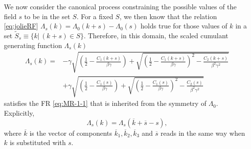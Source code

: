 \documentclass[a4paper,11pt]{article}
\numberwithin{equation}{section}
\begin{document}
We now consider the canonical process constraining the possible values of the field $s$ to be in the set $S$. For a fixed $S$, we then know that the relation \eqref{eq:jolieRF}  $\Lambda_s(k) = \Lambda_0 (k+s) - \Lambda_0 (s)$ holds true for those values of $k$ in a set $\widetilde{S}_s \equiv \{ k | \, (k+s) \in S \}$. Therefore, in this domain, the scaled cumulant generating function $\Lambda_s(k)$
\begin{align}
    \Lambda_s(k)=& - \gamma\sqrt{  \left( \frac{1}{2} - \frac{C_1(k+s)}{\beta\gamma}    \right) + \sqrt{\left( \frac{1}{2} - \frac{C_1(k+s)}{\beta\gamma}    \right)^2 - \frac{C_2(k+s)}{\beta^2\gamma^2}}} \nonumber \\
    &+ \gamma\sqrt{  \left( \frac{1}{2} - \frac{C_1(s)}{\beta\gamma}    \right) + \sqrt{\left( \frac{1}{2} - \frac{C_1(s)}{\beta\gamma}    \right)^2 - \frac{C_2(s)}{\beta^2\gamma^2}}}   
\end{align}
satisfies the FR \eqref{eq:MR-1-1} that is inherited from the symmetry of $\Lambda_0$. Explicitly,
\begin{equation}
    \Lambda_s(k) = \Lambda_s(\overline{k}+\overline{s}-s),
\end{equation}
where $\overline{k}$ is the vector of components $\overline{k}_1,\overline{k}_2,\overline{k}_3$ and $\overline{s}$ reads in the same way when $k$ is substituted with $s$. 
\end{document}

